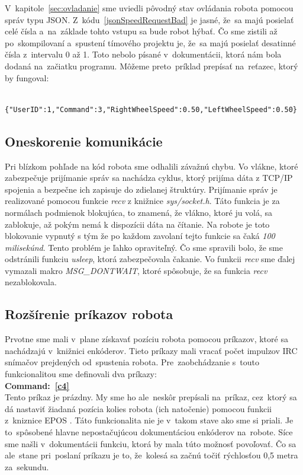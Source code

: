 V~kapitole~\ref{sec:ovladanie} sme uviedli pôvodný stav ovládania robota pomocou správ typu JSON.
Z~kódu~\ref{jsonSpeedRequestBad} je jasné, že~sa majú posielať celé čísla a~na~základe tohto vstupu sa bude robot hýbať. Čo sme zistili až
po~skompilovaní a~spustení tímového projektu je, že~sa majú posielať desatinné čísla z~intervalu 0 až 1. Toto nebolo písané
v~dokumentácii, ktorá nám bola dodaná na~začiatku programu. Môžeme preto~príklad prepísať na~reťazec, ktorý by fungoval:

	\label{jsonSpeedRequestGood}
	\begin{lstlisting}
			{"UserID":1,"Command":3,"RightWheelSpeed":0.50,"LeftWheelSpeed":0.50}
	\end{lstlisting}

\subsection{Oneskorenie komunikácie}
\label{subsec:communicationDelay}

Pri blízkom pohľade na kód robota sme odhalili závažnú chybu. Vo vlákne, ktoré zabezpečuje prijímanie správ sa nachádza
cyklus, ktorý prijíma dáta z TCP/IP spojenia a bezpečne ich zapisuje do zdielanej štruktúry. Prijímanie správ je realizované
pomocou funkcie \textit{recv} z knižnice \textit{sys/socket.h}. Táto funkcia je za normálach podmienok blokujúca, to znamená,
že vlákno, ktoré ju volá, sa zablokuje, až pokým nemá k dispozícii dáta na čítanie. Na robote je toto blokovanie
vypnutý s tým že po každom zavolaní tejto funkcie sa čaká \textit{100 milisekúnd}. Tento problém je ľahko opraviteľný.
Čo sme spravili bolo, že sme odstránili funkciu \textit{usleep}, ktorá zabezpečovala čakanie. Vo funkcii \textit{recv}
sme ďalej vymazali makro \textit{MSG\_DONTWAIT}, ktoré spôsobuje, že sa funkcia \textit{recv} nezablokovala.

\subsection{Rozšírenie príkazov robota}
\label{subsec:extendRobotCommands}

Prvotne sme mali v~plane získavať pozíciu robota pomocou príkazov, ktoré sa nachádzajú v~knižnici enkóderov.
Tieto príkazy mali vracať počet impulzov IRC snímačov prejdených od~spustenia robota.
Pre~zaobchádzanie s~touto funkcionalitou sme definovali dva príkazy:\\

\noindent \textbf{Command:~\ref{c4}} \\
\indent Tento príkaz je prázdny. My sme ho ale~neskôr prepísali na~príkaz, cez~ktorý sa dá nastaviť
žiadaná pozícia kolies robota (ich natočenie) pomocou funkcii z~kniznice EPOS \cite{EPOSdoc}.
Táto funkcionalita nie je v~takom stave ako sme si priali. Je to~spôsobené hlavne nepostačujúcou dokumentáciou enkóderov na~robote. Síce sme našli
v~dokumentácii funkciu, ktorá by mala túto možnosť povoľovať. Čo sa ale~stane pri~poslaní príkazu je to, že~kolesá sa začnú točiť rýchlosťou
0,5 metra za~sekundu.\\

